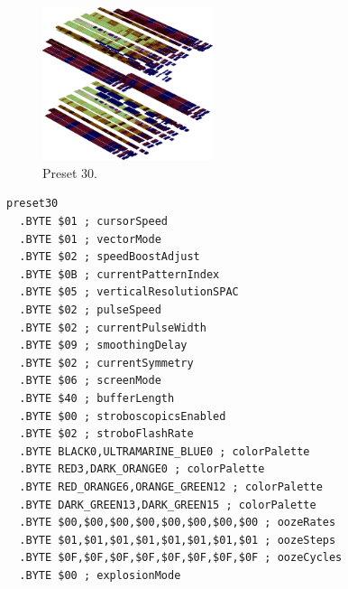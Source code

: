 \clearpage
\begin{minipage}[b]{0.48\linewidth}
\begin{figure}[H]                                                          
  \centering                                                             
  \begin{adjustbox}{width=5cm,center}                                   
  \includegraphics[width=5cm]{src/colorspace_presets/preset30-45.png}%
  \end{adjustbox}                                                        
\caption*{Preset 30.}                                           
\end{figure}                                                               
\end{minipage}
\hspace{0.1cm}
\begin{minipage}[b]{0.48\linewidth}                            
\begin{lstlisting}[basicstyle=\ttfamily\tiny]
preset30
  .BYTE $01 ; cursorSpeed
  .BYTE $01 ; vectorMode
  .BYTE $02 ; speedBoostAdjust
  .BYTE $0B ; currentPatternIndex
  .BYTE $05 ; verticalResolutionSPAC
  .BYTE $02 ; pulseSpeed
  .BYTE $02 ; currentPulseWidth
  .BYTE $09 ; smoothingDelay
  .BYTE $02 ; currentSymmetry
  .BYTE $06 ; screenMode
  .BYTE $40 ; bufferLength
  .BYTE $00 ; stroboscopicsEnabled
  .BYTE $02 ; stroboFlashRate
  .BYTE BLACK0,ULTRAMARINE_BLUE0 ; colorPalette
  .BYTE RED3,DARK_ORANGE0 ; colorPalette
  .BYTE RED_ORANGE6,ORANGE_GREEN12 ; colorPalette
  .BYTE DARK_GREEN13,DARK_GREEN15 ; colorPalette
  .BYTE $00,$00,$00,$00,$00,$00,$00,$00 ; oozeRates
  .BYTE $01,$01,$01,$01,$01,$01,$01,$01 ; oozeSteps
  .BYTE $0F,$0F,$0F,$0F,$0F,$0F,$0F,$0F ; oozeCycles
  .BYTE $00 ; explosionMode
\end{lstlisting}
\end{minipage}

\vspace*{0.3cm}


